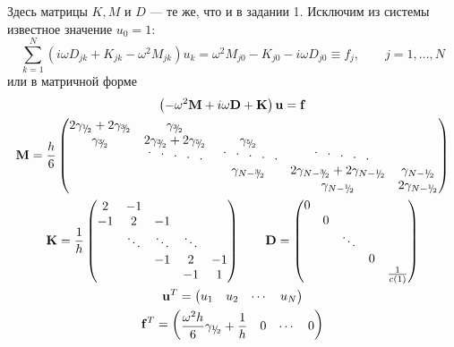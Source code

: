 \documentclass[12pt]{article}
\newcommand{\cutefrac}[2]{{}^{#1\!}\!/{\!}_#2}
\newcommand{\half}{\cutefrac{1}{2}}
\newcommand{\cuteddots}{
\text{
\raisebox{.6ex}{$\cdot$}\hspace{.75em}%
\raisebox{.3ex}{$\cdot$}\hspace{.75em}%
$\cdot$\hspace{.75em}%
\raisebox{-.3ex}{$\cdot$}\hspace{.75em}%
\raisebox{-.6ex}{$\cdot$}%
}}
\begin{document}
Здесь матрицы $K, M$ и $D$ --- те же, что и в задании 1. Исключим из системы
известное значение $u_0 = 1$:
\[
\sum_{k=1}^N \left(i\omega D_{jk} + K_{jk} -\omega^2 M_{jk}\right) u_k =
\omega^2 M_{j0} - K_{j0} -i\omega D_{j0} \equiv f_j, \qquad j = 1, \dots, N
\]
или в матричной форме
\begin{gather*}
\left(-\omega^2 \mathbf{M} + i\omega \mathbf{D} + \mathbf{K}\right) \mathbf{u}=
\mathbf{f}\\
\mathbf{M} = 
\frac{h}{6}
\begin{pmatrix}
2\gamma_{\half} + 2\gamma_{\cutefrac{3}{2}} & \gamma_{\cutefrac{3}{2}}\\
\gamma_{\cutefrac{3}{2}} & 2\gamma_{\cutefrac{3}{2}} + 2\gamma_{\cutefrac{5}{2}} & \gamma_{\cutefrac{5}{2}}\\
& \cuteddots\; & \cuteddots & \;\cuteddots \\
& & \gamma_{N - \cutefrac{3}{2}} & 2\gamma_{N - \cutefrac{3}{2}} + 2\gamma_{N
- \half} & \gamma_{N-\half}\\
& & & \gamma_{N - \half} & 2\gamma_{N-\half}
\end{pmatrix}
\\
\mathbf{K} = 
\frac{1}{h}
\begin{pmatrix}
2 & -1\\
-1 & 2 & -1\\
& \ddots & \ddots & \ddots \\
& & -1 & 2 & -1\\
& & & -1 & 1
\end{pmatrix}\qquad
\mathbf{D} = 
\begin{pmatrix}
0  \\
& 0 \\
& & \ddots \\
& & & 0 \\
& & & & \frac{1}{c(1)}
\end{pmatrix}\\
\mathbf{u}^T = \begin{pmatrix} u_1 & u_2 & \cdots & u_N \end{pmatrix}\\
\mathbf{f}^T = \begin{pmatrix} \dfrac{\omega^2 h}{6}\gamma_{\half} + \dfrac{1}{h} & 0 & \cdots & 0 \end{pmatrix}
\end{gather*}
\end{document}
